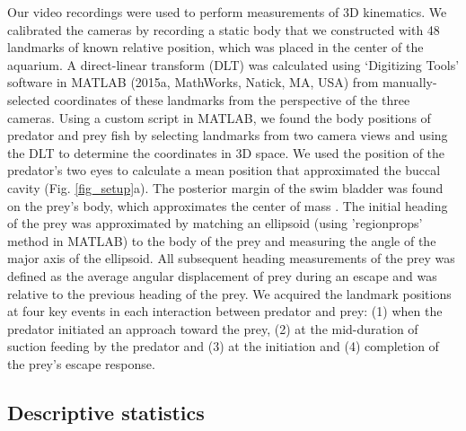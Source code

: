 \documentclass[]{rsos}%
\begin{document}
Our video recordings were used to perform measurements of 3D kinematics. 
We calibrated the cameras by recording a static body that we constructed with 48 landmarks of known relative position, which was placed in the center of the aquarium.
A direct-linear transform (DLT) was calculated using `Digitizing Tools' software in MATLAB (2015a, MathWorks, Natick, MA, USA) \cite{Hedrick:2008wz} from manually-selected coordinates of these landmarks from the perspective of the three cameras.
Using a custom script in MATLAB, we found the body positions of predator and prey fish by selecting landmarks from two camera views and using the DLT to determine the coordinates in 3D space.
We used the position of the predator's two eyes to calculate a mean position that approximated the buccal cavity (Fig. \ref{fig_setup}a).
The posterior margin of the swim bladder was found on the prey's body, which approximates the center of mass \cite{Stewart:2010ig}.
The initial heading of the prey was approximated by matching an ellipsoid (using 'regionprops' method in MATLAB) to the body of the prey and measuring the angle of the major axis of the ellipsoid.
All subsequent heading measurements of the prey was defined as the average angular displacement of prey during an escape and was relative to the previous heading of the prey.
We acquired the landmark positions at four key events in each interaction between predator and prey: (1) when the predator initiated an approach toward the prey, (2) at the mid-duration of suction feeding by the predator and (3) at the initiation and (4) completion of the prey's escape response.


\subsection{Descriptive statistics}
\end{document}
